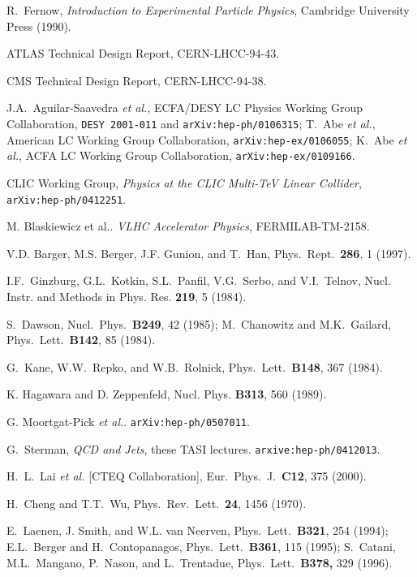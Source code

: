 \documentclass[prd,aps,floats,preprintnumbers,preprint,superscriptaddress,floatfix,nofootinbib]{revtex4}
\begin{document}
\begin{thebibliography}{99}
R.~Fernow, {\it Introduction to 
Experimental Particle Physics}, Cambridge University Press (1990).

ATLAS Technical Design Report, CERN-LHCC-94-43.

 CMS Technical Design Report, CERN-LHCC-94-38.

J.A.~Aguilar-Saavedra {\it et al.}, ECFA/DESY LC
Physics Working Group Collaboration, {\tt DESY 2001-011}
and {\tt arXiv:hep-ph/0106315};
T.~Abe {\it et al.}, American LC Working Group Collaboration, 
{\tt arXiv:hep-ex/0106055};
K.~Abe {\it et al.}, ACFA LC Working Group Collaboration, 
{\tt arXiv:hep-ex/0109166}.

CLIC Working Group, {\it Physics at the CLIC Multi-TeV
Linear Collider}, {\tt arXiv:hep-ph/0412251}.

 M. Blaskiewicz et al..  {\it VLHC Accelerator Physics},
FERMILAB-TM-2158.

V.D. Barger, M.S. Berger, J.F. Gunion, and T.~Han, 
Phys.~Rept.~{\bf 286}, 1 (1997).

 I.F.~Ginzburg, G.L.~Kotkin, S.L.~Panfil, V.G.~Serbo,
and V.I.~Telnov, Nucl. Instr. and Methods in Phys. Res. {\bf  219}, 5 (1984).

S.~Dawson, Nucl.~Phys.~{\bf B249}, 42 (1985); 
M.~Chanowitz and M.K.~Gailard, Phys.~Lett.~{\bf B142}, 85 (1984).

 G.~Kane, W.W.~Repko, and W.B.~Rolnick, 
 Phys.~Lett.~{\bf B148}, 367 (1984).
 
K. Hagawara and D. Zeppenfeld, Nucl. Phys. {\bf B313}, 560 (1989).

G. Moortgat-Pick {\it et al.}. {\tt  arXiv:hep-ph/0507011}.

G.~Sterman, {\it QCD and Jets},  these TASI lectures.
{\tt arxive:hep-ph/0412013}.

  H.~L.~Lai {\it et al.}  [CTEQ Collaboration],
  Eur.\ Phys.\ J.~{\bf C12}, 375 (2000).

 H.~Cheng and T.T.~Wu, Phys.~Rev.~Lett.~{\bf 24}, 1456 (1970).

 E.~Laenen, J. Smith, and W.L. van Neerven, Phys.~Lett.~{\bf B321}, 254 (1994); 
  E.L.~Berger and H.~Contopanagos, Phys.~Lett.~{\bf B361}, 115 (1995); 
 S.~Catani, M.L.~Mangano, P.~Nason, and L.~Trentadue, 
 Phys.~Lett.~{\bf B378,} 329 (1996).
 

\end{thebibliography}
\end{document}
